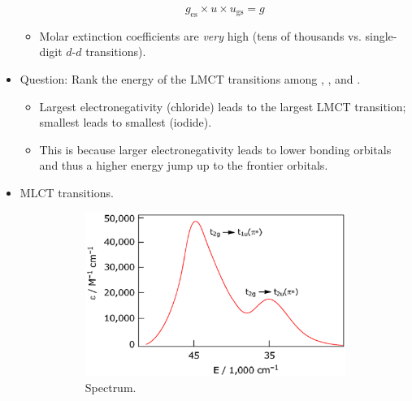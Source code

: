 \documentclass[../notes.tex]{subfiles}
\begin{document}
\begin{itemize}
\begin{itemize}
\begin{equation*}
            g_\text{es}\times u\times u_\text{gs} = g
        \end{equation*}
        \item Molar extinction coefficients are \emph{very} high (tens of thousands vs. single-digit $d$-$d$ transitions).
    \end{itemize}
    \item Question: Rank the energy of the LMCT transitions among , , and .
    \begin{itemize}
        \item Largest electronegativity (chloride) leads to the largest LMCT transition; smallest leads to smallest (iodide).
        \item This is because larger electronegativity leads to lower bonding orbitals and thus a higher energy jump up to the frontier orbitals.
    \end{itemize}
    \item MLCT transitions.
    \begin{figure}[h!]
        \centering
        \begin{subfigure}[b]{0.4\linewidth}
            \centering
            \includegraphics[width=\linewidth]{../ExtFiles/MLCTa.png}
            \caption{Spectrum.}
            \label{fig:MLCTa}
        \end{subfigure}
        \begin{subfigure}[b]{0.28\linewidth}
            \centering
\end{subfigure}
\end{figure}
\end{itemize}
\end{document}
